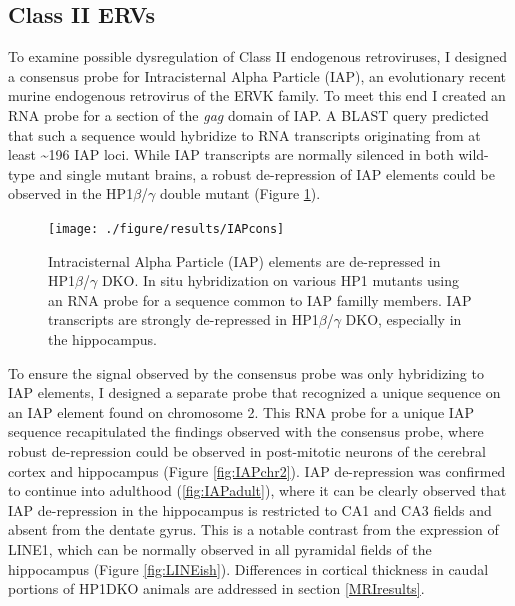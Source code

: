 \documentclass[onehalf,12pt]{beavtex}
\begin{document}
  \subsection{Class II ERVs}\label{class-ii-ervs}
  
  To examine possible dysregulation of Class II endogenous retroviruses, I
  designed a consensus probe for Intracisternal Alpha Particle (IAP), an
  evolutionary recent murine endogenous retrovirus of the ERVK family. To
  meet this end I created an RNA probe for a section of the \emph{gag}
  domain of IAP. A BLAST query predicted that such a sequence would
  hybridize to RNA transcripts originating from at least
  \textasciitilde{}196 IAP loci. While IAP transcripts are normally
  silenced in both wild-type and single mutant brains, a robust
  de-repression of IAP elements could be observed in the
  HP1\(\beta\)/\(\gamma\) double mutant (Figure \ref{fig:IAPcons}).
  
  \begin{figure}
  
  {\centering \texttt{[image: ./figure/results/IAPcons]} 
  
  }
  
  \caption[Intracisternal Alpha Particle (IAP) elements are de-repressed in HP1$\beta$/$\gamma$ DKO]{Intracisternal Alpha Particle (IAP) elements are de-repressed in HP1$\beta$/$\gamma$ DKO.  In situ hybridization on various HP1 mutants using an RNA probe for a sequence common to IAP familly members.  IAP transcripts are strongly de-repressed in HP1$\beta$/$\gamma$ DKO, especially in the hippocampus.}\label{fig:IAPcons}
  \end{figure}
  
  \FloatBarrier
  
  To ensure the signal observed by the consensus probe was only
  hybridizing to IAP elements, I designed a separate probe that recognized
  a unique sequence on an IAP element found on chromosome 2. This RNA
  probe for a unique IAP sequence recapitulated the findings observed with
  the consensus probe, where robust de-repression could be observed in
  post-mitotic neurons of the cerebral cortex and hippocampus (Figure
  \ref{fig:IAPchr2}). IAP de-repression was confirmed to continue into
  adulthood (\ref{fig:IAPadult}), where it can be clearly observed that
  IAP de-repression in the hippocampus is restricted to CA1 and CA3 fields
  and absent from the dentate gyrus. This is a notable contrast from the
  expression of LINE1, which can be normally observed in all pyramidal
  fields of the hippocampus (Figure \ref{fig:LINEish}). Differences in
  cortical thickness in caudal portions of HP1DKO animals are addressed in
  section \ref{MRIresults}.
  
\end{document}
